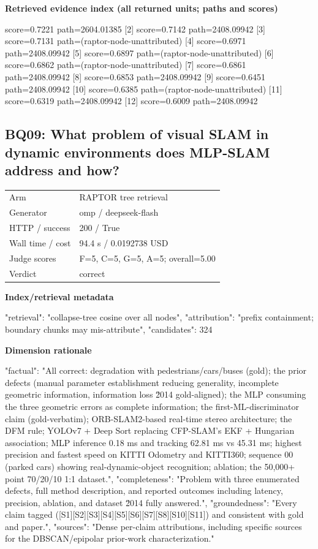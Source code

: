 \documentclass[10pt]{article}
\begin{document}
\textbf{Retrieved evidence index (all returned units; paths and scores) }
\begin{EvidenceText}
[1] score=0.7221 path=2604.01385
[2] score=0.7142 path=2408.09942
[3] score=0.7131 path=(raptor-node-unattributed)
[4] score=0.6971 path=2408.09942
[5] score=0.6897 path=(raptor-node-unattributed)
[6] score=0.6862 path=(raptor-node-unattributed)
[7] score=0.6861 path=2408.09942
[8] score=0.6853 path=2408.09942
[9] score=0.6451 path=2408.09942
[10] score=0.6385 path=(raptor-node-unattributed)
[11] score=0.6319 path=2408.09942
[12] score=0.6009 path=2408.09942
\end{EvidenceText}
\subsection{BQ09: What problem of visual SLAM in dynamic environments does MLP-SLAM address and how?}
\begin{tabular}{@{}ll@{}}
Arm & RAPTOR tree retrieval\\
Generator & omp / deepseek-flash\\
HTTP / success & 200 / True\\
Wall time / cost & 94.4 s / 0.0192738 USD\\
Judge scores & F=5, C=5, G=5, A=5; overall=5.00\\
Verdict & correct\\
\end{tabular}

\textbf{Index/retrieval metadata}
\begin{EvidenceText}
{
  "retrieval": "collapse-tree cosine over all nodes",
  "attribution": "prefix containment; boundary chunks may mis-attribute",
  "candidates": 324
}
\end{EvidenceText}

\textbf{Dimension rationale}
\begin{EvidenceText}
{
  "factual": "All correct: degradation with pedestrians/cars/buses (gold); the prior defects (manual parameter establishment reducing generality, incomplete geometric information, information loss \u2014 gold-aligned); the MLP consuming the three geometric errors as complete information; the first-ML-discriminator claim (gold-verbatim); ORB-SLAM2-based real-time stereo architecture; the DFM rule; YOLOv7 + Deep Sort replacing CFP-SLAM's EKF + Hungarian association; MLP inference 0.18 ms and tracking 62.81 ms vs 45.31 ms; highest precision and fastest speed on KITTI Odometry and KITTI360; sequence 00 (parked cars) showing real-dynamic-object recognition; ablation; the 50,000+ point 70/20/10 1:1 dataset.",
  "completeness": "Problem with three enumerated defects, full method description, and reported outcomes including latency, precision, ablation, and dataset \u2014 fully answered.",
  "groundedness": "Every claim tagged ([S1][S2][S3][S4][S5][S6][S7][S8][S10][S11]) and consistent with gold and paper.",
  "sources": "Dense per-claim attributions, including specific sources for the DBSCAN/epipolar prior-work characterization."
}
\end{EvidenceText}
\end{document}
